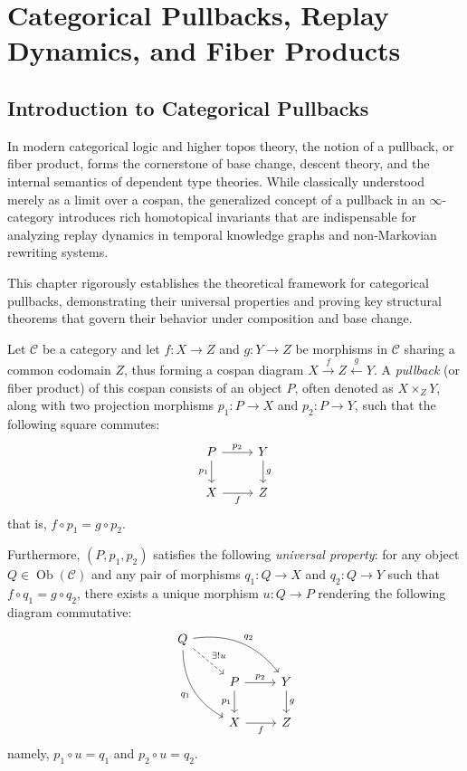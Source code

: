 \chapter{Categorical Pullbacks, Replay Dynamics, and Fiber Products}
\label{ch:pullbacks}

\section{Introduction to Categorical Pullbacks}

In modern categorical logic and higher topos theory, the notion of a pullback, or fiber product, forms the cornerstone of base change, descent theory, and the internal semantics of dependent type theories. While classically understood merely as a limit over a cospan, the generalized concept of a pullback in an $\infty$-category introduces rich homotopical invariants that are indispensable for analyzing replay dynamics in temporal knowledge graphs and non-Markovian rewriting systems. 

This chapter rigorously establishes the theoretical framework for categorical pullbacks, demonstrating their universal properties and proving key structural theorems that govern their behavior under composition and base change.

\begin{definition}[Pullback]
Let $\mathcal{C}$ be a category and let $f: X \to Z$ and $g: Y \to Z$ be morphisms in $\mathcal{C}$ sharing a common codomain $Z$, thus forming a cospan diagram $X \xrightarrow{f} Z \xleftarrow{g} Y$. A \emph{pullback} (or fiber product) of this cospan consists of an object $P$, often denoted as $X \times_Z Y$, along with two projection morphisms $p_1: P \to X$ and $p_2: P \to Y$, such that the following square commutes:
\begin{equation}
\label{eq:pullback_square}
\begin{tikzcd}
P \arrow[r, "p_2"] \arrow[d, "p_1"'] & Y \arrow[d, "g"] \\
X \arrow[r, "f"'] & Z
\end{tikzcd}
\end{equation}
that is, $f \circ p_1 = g \circ p_2$. 

Furthermore, $(P, p_1, p_2)$ satisfies the following \emph{universal property}: for any object $Q \in \operatorname{Ob}(\mathcal{C})$ and any pair of morphisms $q_1: Q \to X$ and $q_2: Q \to Y$ such that $f \circ q_1 = g \circ q_2$, there exists a unique morphism $u: Q \to P$ rendering the following diagram commutative:
\begin{equation}
\label{eq:pullback_universal}
\begin{tikzcd}
Q \arrow[drr, "q_2", bend left] \arrow[ddr, "q_1"', bend right] \arrow[dr, dashed, "\exists ! u"] & & \\
& P \arrow[r, "p_2"] \arrow[d, "p_1"'] & Y \arrow[d, "g"] \\
& X \arrow[r, "f"'] & Z
\end{tikzcd}
\end{equation}
namely, $p_1 \circ u = q_1$ and $p_2 \circ u = q_2$.
\end{definition}

